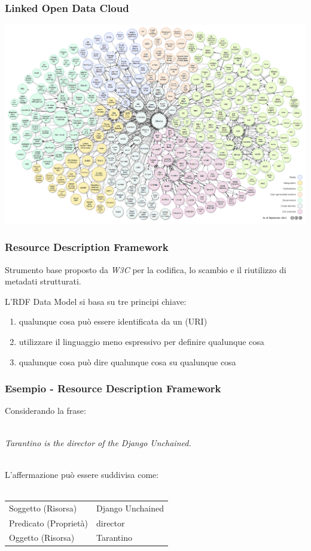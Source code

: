 \documentclass{beamer}
\begin{document}

\begin{frame}
\frametitle{Linked Open Data Cloud}
\includegraphics[width=.95\textwidth]{figure/lodcloud}
\end{frame}


\begin{frame}
\frametitle{Resource Description Framework}
Strumento base proposto da \emph{W3C} per la codifica, lo scambio e il riutilizzo di metadati strutturati.

L'RDF Data Model si basa su tre principi chiave:
\begin{enumerate}
\item qualunque cosa può essere identificata da un (URI)
\item utilizzare il linguaggio meno espressivo per definire qualunque cosa
\item qualunque cosa può dire qualunque cosa su qualunque cosa
\end{enumerate}
\end{frame}


\begin{frame}
\frametitle{Esempio - Resource Description Framework}
Considerando la frase:\\~\\
\begin{center} \emph{Tarantino is the director of the Django Unchained.} \\~\\
\end{center}
L'affermazione può essere suddivisa come: \\~\\
\begin{tabular}{ l | l }
    Soggetto (Risorsa) & Django Unchained \\
    Predicato (Proprietà) & director \\
    Oggetto (Risorsa) & Tarantino \\
\end{tabular}
\end{frame}
\end{document}
